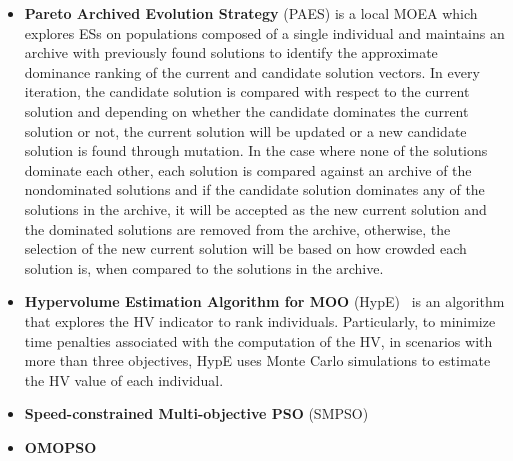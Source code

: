 \begin{itemize}
	
	\item \textbf{Pareto Archived Evolution Strategy} (PAES) \cite{Knowles1999} is a local \ac{MOEA} which explores \acp{ES} on populations composed of a single individual and maintains an archive with previously found solutions to identify the approximate dominance ranking of the current and candidate solution vectors. In every iteration, the candidate solution is compared with respect to the current solution and depending on whether the candidate dominates the current solution or not, the current solution will be updated or a new candidate solution is found through mutation. In the case where none of the solutions dominate each other, each solution is compared against an archive of the nondominated solutions and if the candidate solution dominates any of the solutions in the archive, it will be accepted as the new current solution and the dominated solutions are removed from the archive, otherwise, the selection of the new current solution will be based on how crowded each solution is, when compared to the solutions in the archive. 
	
	\item \textbf{Hypervolume Estimation Algorithm for \ac{MOO}} (HypE)~\cite{Zitzler2011HypE} is an algorithm that explores the \ac{HV} indicator to rank individuals. Particularly, to minimize time penalties associated with the computation of the \ac{HV}, in scenarios with more than three objectives, HypE uses Monte Carlo simulations to estimate the \ac{HV} value of each individual.
	
	\item \textbf{Speed-constrained Multi-objective \ac{PSO}} (SMPSO)
	
	\item \textbf{OMOPSO}
	
\end{itemize}

